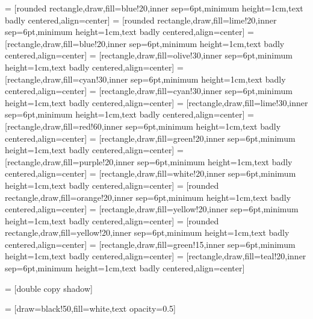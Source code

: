 
 = [rounded rectangle,draw,fill=blue!20,inner sep=6pt,minimum height=1cm,text badly centered,align=center]
 = [rounded rectangle,draw,fill=lime!20,inner sep=6pt,minimum height=1cm,text badly centered,align=center]
 = [rectangle,draw,fill=blue!20,inner sep=6pt,minimum height=1cm,text badly centered,align=center]
 = [rectangle,draw,fill=olive!30,inner sep=6pt,minimum height=1cm,text badly centered,align=center]
 = [rectangle,draw,fill=cyan!30,inner sep=6pt,minimum height=1cm,text badly centered,align=center]
 = [rectangle,draw,fill=cyan!30,inner sep=6pt,minimum height=1cm,text badly centered,align=center]
 = [rectangle,draw,fill=lime!30,inner sep=6pt,minimum height=1cm,text badly centered,align=center]
 = [rectangle,draw,fill=red!60,inner sep=6pt,minimum height=1cm,text badly centered,align=center]
 = [rectangle,draw,fill=green!20,inner sep=6pt,minimum height=1cm,text badly centered,align=center]
 = [rectangle,draw,fill=purple!20,inner sep=6pt,minimum height=1cm,text badly centered,align=center]
 = [rectangle,draw,fill=white!20,inner sep=6pt,minimum height=1cm,text badly centered,align=center]
 = [rounded rectangle,draw,fill=orange!20,inner sep=6pt,minimum height=1cm,text badly centered,align=center]
 = [rectangle,draw,fill=yellow!20,inner sep=6pt,minimum height=1cm,text badly centered,align=center]
 = [rounded rectangle,draw,fill=yellow!20,inner sep=6pt,minimum height=1cm,text badly centered,align=center]
 = [rectangle,draw,fill=green!15,inner sep=6pt,minimum height=1cm,text badly centered,align=center]
 = [rectangle,draw,fill=teal!20,inner sep=6pt,minimum height=1cm,text badly centered,align=center]

 = [double copy shadow]

 = [draw=black!50,fill=white,text opacity=0.5]

